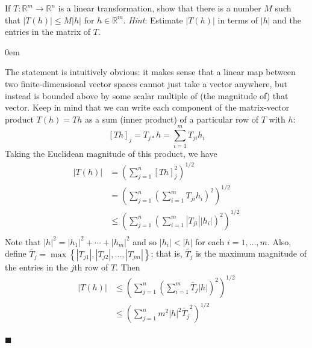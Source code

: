 \documentclass[12pt]{article}
\renewcommand{\qed}{\hfill$\blacksquare$}
\renewenvironment{proof}{\begin{addmargin}[1em]{0em}\begin{newproof}}{\end{newproof}\end{addmargin}\qed}
\newenvironment{problem}[2][Problem]{\begin{trivlist}
\item[\hskip \labelsep {\bfseries #1}\hskip \labelsep {\bfseries #2.}]}{\end{trivlist}}
\begin{document}
 
\begin{problem}{1.10} %

If $T:\mathbb{R}^m \rightarrow \mathbb{R}^n$ is a linear transformation, show that there is a number $M$ such that $\left| T\left(h\right)\right| \leq M \left|h\right|$ for $h \in \mathbb{R}^m$. \textit{Hint}: Estimate $\left|T\left(h\right)\right|$ in terms of $\left|h\right|$ and the entries in the matrix of $T$.
\end{problem}
 
\begin{proof}
The statement is intuitively obvious: it makes sense that a linear map between two finite-dimensional vector spaces cannot just take a vector anywhere, but instead is bounded above by some scalar multiple of (the magnitude of) that vector. Keep in mind that we can write each component of the matrix-vector product $T\left(h\right) = T h$ as a sum (inner product) of a particular row of $T$ with $h$:
$$\left[ Th\right]_j = T_{j*} h = \sum_{i=1}^m T_{ji} h_i $$
Taking the Euclidean magnitude of this product, we have
\begin{equation*}
\begin{split}
\left| T\left(h\right) \right| & = \left( \sum_{j=1}^n \left[Th\right]_j^2 \right)^{1/2} \\
& = \left( \sum_{j=1}^n \left( \sum_{i=1}^m T_{ji}h_i \right)^2 \right)^{1/2} \\
& \leq \left( \sum_{j=1}^n \left( \sum_{i=1}^m \left|T_{ji}\right| \left| h_i \right| \right)^2 \right)^{1/2} \\
\end{split}
\end{equation*}
Note that $\left|h\right|^2 = \left|h_1\right|^2+ \cdots + \left|h_m\right|^2$ and so $\left|h_i\right| < \left|h\right|$ for each $i=1,\ldots,m$. Also, define $\tilde{T_j} = \max \left\{ \left|T_{j1}\right|, \left| T_{j2}\right|,\ldots,\left|T_{jm}\right| \right\}$; that is, $\tilde{T_j}$ is the maximum magnitude of the entries in the $j$th row of $T$. Then
\begin{equation*}
\begin{split}
\left|T\left(h\right)\right| & \leq \left( \sum_{j=1}^n \left(  \sum_{i=1}^m \tilde{T_j} \left|h\right| \right)^2 \right)^{1/2} \\
& \leq \left( \sum_{j=1}^n  m^2 \left|h\right|^2 \tilde{T_j}^2 \right)^{1/2} \\
\end{split}

\end{equation*}
\end{proof}
\end{document}
